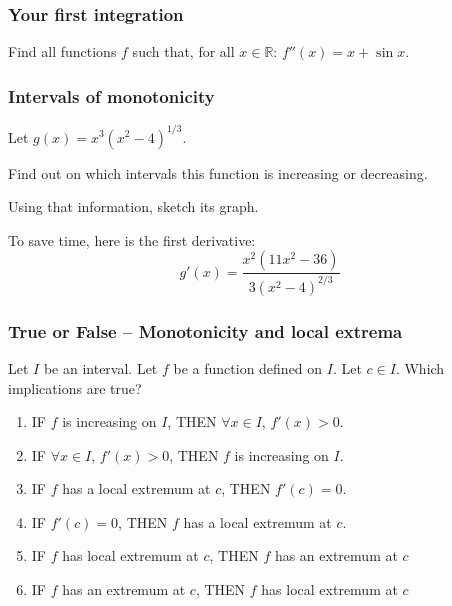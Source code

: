 \documentclass[14pt]{beamer}
\begin{document}
\begin{frame}[t]
	\frametitle{Your first integration}

	Find all functions $f$ such that, for all $\displaystyle x \in \mathbb{R}$:
	$\displaystyle f''(x) = x + \sin x$.
\end{frame}

\begin{frame}
	\frametitle{Intervals of monotonicity}

	Let $\displaystyle g(x) = x^{3}(x^{2}-4)^{1/3}.$

	Find out on which intervals this function is increasing or decreasing.

	Using that information, sketch its graph.

	To save time, here is the first derivative:
	\[
		g'(x) = \frac{x^{2}(11x^{2}-36)}{3(x^{2}-4)^{2/3}}
	\]
\end{frame}

\begin{frame}[t]
	\fontsize{13}{13}\selectfont
	\frametitle{True or False -- Monotonicity and local extrema}

	Let $I$ be an interval. Let $f$ be a function defined on $I$. Let $c \in I$.
	Which implications are true?

	\begin{enumerate}
		\item IF {\color{red} $f$ is increasing on $I$}, \quad THEN
			{\color{blue} $\forall x \in I$, $f'(x) >0$}.

		\item IF {\color{blue} $\forall x \in I$, $f'(x) >0$}, \quad THEN
			{\color{red} $f$ is increasing on $I$}.

		\item IF {\color{rosa} $f$ has a local extremum at $c$}, \quad THEN
			{\color{naranja} $f'(c)=0$}.

		\item IF {\color{naranja} $f'(c)=0$}, \quad THEN
			{\color{rosa} $f$ has a local extremum at $c$}.

		\item IF {\color{rosa} $f$ has local extremum at $c$}, \; THEN
			{\color{verde} $f$ has an extremum at $c$}

		\item IF {\color{verde} $f$ has an extremum at $c$}, \; THEN
			{\color{rosa} $f$ has local extremum at $c$}
	\end{enumerate}
\end{frame}
\end{document}
